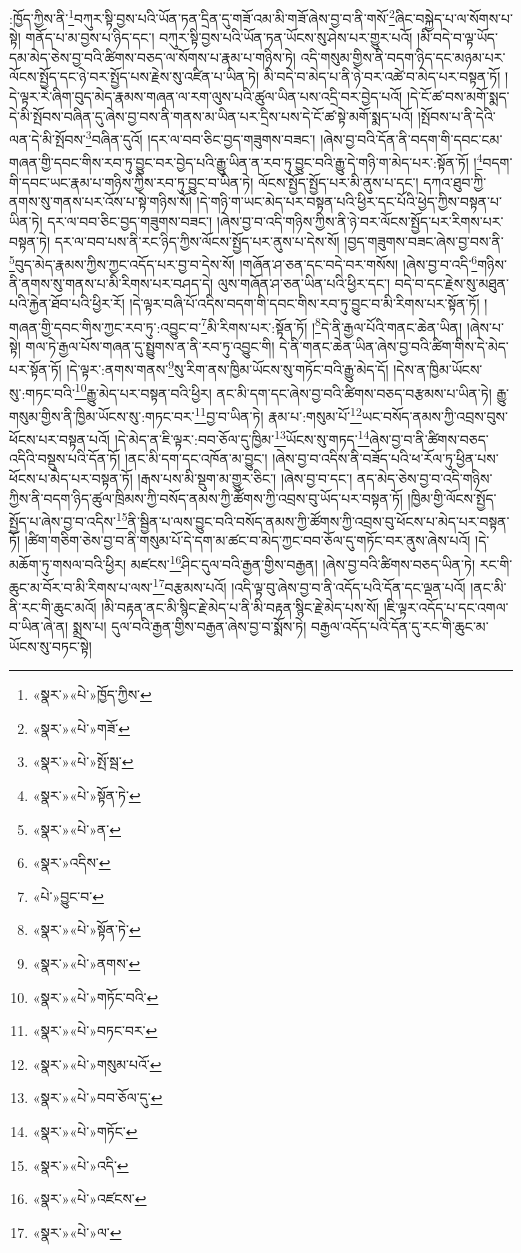 :ཁྱོད་ཀྱིས་ནི་\footnote{«སྣར་»«པེ་»ཁྱོད་ཀྱིས་}བཀུར་སྟི་བྱས་པའི་ཡོན་ཏན་དྲིན་དུ་གཟོ་འམ་མི་གཟོ་ཞེས་བྱ་བ་ནི་གསོ་\footnote{«སྣར་»«པེ་»གཟོ་}ཞིང་བསྐྱེད་པ་ལ་སོགས་པ་སྟེ། གནོད་པ་མ་བྱས་པ་ཉིད་དང་། བཀུར་སྟི་བྱས་པའི་ཡོན་ཏན་ཡོངས་སུ་ཤེས་པར་གྱུར་པའོ། །མི་བདེ་བ་ལྟ་ཡོད་དམ་མེད་ཅེས་བྱ་བའི་ཚིགས་བཅད་ལ་སོགས་པ་རྣམ་པ་གཉིས་ཏེ། འདི་གསུམ་གྱིས་ནི་བདག་ཉིད་དང་མཉམ་པར་ལོངས་སྤྱོད་དང་ཉེ་བར་སྤྱོད་པས་རྗེས་སུ་འཛིན་པ་ཡིན་ཏེ། མི་བདེ་བ་མེད་པ་ནི་ཉེ་བར་འཚེ་བ་མེད་པར་བསྟན་ཏོ། །དེ་ལྟར་རེ་ཞིག་བུད་མེད་རྣམས་གཞན་ལ་རག་ལུས་པའི་ཚུལ་ཡིན་པས་འདྲི་བར་བྱེད་པའོ། །དེ་ངོ་ཚ་བས་མགོ་སྨད་དེ་མི་སྤོབས་བཞིན་དུ་ཞེས་བྱ་བས་ནི་གནས་མ་ཡིན་པར་དྲིས་པས་དེ་ངོ་ཚ་སྟེ་མགོ་སྨད་པའོ། །སྤོབས་པ་ནི་དེའི་ལན་དེ་མི་སྤོབས་\footnote{«སྣར་»«པེ་»སྤོ་སྦ་}བཞིན་དུའོ། །དར་ལ་བབ་ཅིང་བྱད་གཟུགས་བཟང་། །ཞེས་བྱ་བའི་དོན་ནི་བདག་གི་དབང་ངམ་གཞན་གྱི་དབང་གིས་རབ་ཏུ་བྱུང་བར་བྱེད་པའི་རྒྱུ་ཡིན་ན་རབ་ཏུ་བྱུང་བའི་རྒྱུ་དེ་གཉི་ག་མེད་པར་:སྟོན་ཏོ། །\footnote{«སྣར་»«པེ་»སྟོན་ཏེ་}བདག་གི་དབང་ཡང་རྣམ་པ་གཉིས་ཀྱིས་རབ་ཏུ་བྱུང་བ་ཡིན་ཏེ། ལོངས་སྤྱོད་སྤྱོད་པར་མི་ནུས་པ་དང་། དཀའ་ཐུབ་ཀྱི་ནགས་སུ་གནས་པར་འོས་པ་སྟེ་གཉིས་སོ། །དེ་གཉི་ག་ཡང་མེད་པར་བསྟན་པའི་ཕྱིར་དང་པོའི་ཕྱེད་ཀྱིས་བསྟན་པ་ཡིན་ཏེ། དར་ལ་བབ་ཅིང་བྱད་གཟུགས་བཟང་། །ཞེས་བྱ་བ་འདི་གཉིས་ཀྱིས་ནི་ཉེ་བར་ལོངས་སྤྱོད་པར་རིགས་པར་བསྟན་ཏེ། དར་ལ་བབ་པས་ནི་རང་ཉིད་ཀྱིས་ལོངས་སྤྱོད་པར་ནུས་པ་དེས་སོ། །བྱད་གཟུགས་བཟང་ཞེས་བྱ་བས་ནི་\footnote{«སྣར་»«པེ་»ན་}བུད་མེད་རྣམས་ཀྱིས་ཀྱང་འདོད་པར་བྱ་བ་དེས་སོ། །གཞོན་ཤ་ཅན་དང་བདེ་བར་གསོས། །ཞེས་བྱ་བ་འདི་\footnote{«སྣར་»འདིས་}གཉིས་ནི་ནགས་སུ་གནས་པ་མི་རིགས་པར་བཤད་དེ། ལུས་གཞོན་ཤ་ཅན་ཡིན་པའི་ཕྱིར་དང་། བདེ་བ་དང་རྗེས་སུ་མཐུན་པའི་རྐྱེན་ཐོབ་པའི་ཕྱིར་རོ། །དེ་ལྟར་བཞི་པོ་འདིས་བདག་གི་དབང་གིས་རབ་ཏུ་བྱུང་བ་མི་རིགས་པར་སྟོན་ཏོ། །གཞན་གྱི་དབང་གིས་ཀྱང་རབ་ཏུ་:འབྱུང་བ་\footnote{«པེ་»བྱུང་བ་}མི་རིགས་པར་:སྟོན་ཏོ། །\footnote{«སྣར་»«པེ་»སྟོན་ཏེ་}དེ་ནི་རྒྱལ་པོའི་གནང་ཆེན་ཡིན། །ཞེས་པ་སྟེ། གལ་ཏེ་རྒྱལ་པོས་གཞན་དུ་སྤྱུགས་ན་ནི་རབ་ཏུ་འབྱུང་གི། དེ་ནི་གནང་ཆེན་ཡིན་ཞེས་བྱ་བའི་ཚིག་གིས་དེ་མེད་པར་སྟོན་ཏོ། །དེ་ལྟར་:ནགས་གནས་\footnote{«སྣར་»«པེ་»ནགས་}སུ་རིག་ནས་ཁྱིམ་ཡོངས་སུ་གཏོང་བའི་རྒྱུ་མེད་དོ། །དེས་ན་ཁྱིམ་ཡོངས་སུ་:གཏང་བའི་\footnote{«སྣར་»«པེ་»གཏོང་བའི་}རྒྱུ་མེད་པར་བསྟན་བའི་ཕྱིར། ནང་མི་དག་དང་ཞེས་བྱ་བའི་ཚིགས་བཅད་བརྩམས་པ་ཡིན་ཏེ། རྒྱུ་གསུམ་གྱིས་ནི་ཁྱིམ་ཡོངས་སུ་:གཏང་བར་\footnote{«སྣར་»«པེ་»བཏང་བར་}བྱ་བ་ཡིན་ཏེ། རྣམ་པ་:གསུམ་པོ་\footnote{«སྣར་»«པེ་»གསུམ་པའོ་}ཡང་བསོད་ནམས་ཀྱི་འབྲས་བུས་ཕོངས་པར་བསྟན་པའོ། །དེ་མེད་ན་ཇི་ལྟར་:བབ་ཅོལ་དུ་ཁྱིམ་\footnote{«སྣར་»«པེ་»བབ་ཅོལ་དུ་}ཡོངས་སུ་གཏད་\footnote{«སྣར་»«པེ་»གཏོང་}ཞེས་བྱ་བ་ནི་ཚིགས་བཅད་འདིའི་བསྡུས་པའི་དོན་ཏོ། །ནང་མི་དག་དང་འཁོན་མ་བྱུང་། །ཞེས་བྱ་བ་འདིས་ནི་བཟོད་པའི་ཕ་རོལ་ཏུ་ཕྱིན་པས་ཕོངས་པ་མེད་པར་བསྟན་ཏོ། །རྒས་པས་མི་སྡུག་མ་གྱུར་ཅིང་། །ཞེས་བྱ་བ་དང་། ནད་མེད་ཅེས་བྱ་བ་འདི་གཉིས་ཀྱིས་ནི་བདག་ཉིད་ཚུལ་ཁྲིམས་ཀྱི་བསོད་ནམས་ཀྱི་ཚོགས་ཀྱི་འབྲས་བུ་ཡོད་པར་བསྟན་ཏོ། །ཁྱིམ་གྱི་ལོངས་སྤྱོད་སྤྱོད་པ་ཞེས་བྱ་བ་འདིས་\footnote{«སྣར་»«པེ་»འདི་}ནི་སྦྱིན་པ་ལས་བྱུང་བའི་བསོད་ནམས་ཀྱི་ཚོགས་ཀྱི་འབྲས་བུ་ཕོངས་པ་མེད་པར་བསྟན་ཏོ། །ཚིག་གཅིག་ཅེས་བྱ་བ་ནི་གསུམ་པོ་དེ་དག་མ་ཚང་བ་མེད་ཀྱང་བབ་ཅོལ་དུ་གཏོང་བར་ནུས་ཞེས་པའོ། །དེ་མཆོག་ཏུ་གསལ་བའི་ཕྱིར། མཛངས་\footnote{«སྣར་»«པེ་»འཛངས་}ཤིང་དུལ་བའི་རྒྱན་གྱིས་བརྒྱན། །ཞེས་བྱ་བའི་ཚིགས་བཅད་ཡིན་ཏེ། རང་གི་ཆུང་མ་བོར་བ་མི་རིགས་པ་ལས་\footnote{«སྣར་»«པེ་»ལ་}བརྩམས་པའོ། །འདི་ལྟ་བུ་ཞེས་བྱ་བ་ནི་འདོད་པའི་དོན་དང་ལྡན་པའོ། །ནང་མི་ནི་རང་གི་ཆུང་མའོ། །མི་བརྟན་ནང་མི་སྙིང་རྗེ་མེད་པ་ནི་མི་བརྟན་སྙིང་རྗེ་མེད་པས་སོ། །ཇི་ལྟར་འདོད་པ་དང་འགལ་བ་ཡིན་ཞེ་ན། སྨྲས་པ། དུལ་བའི་རྒྱན་གྱིས་བརྒྱན་ཞེས་བྱ་བ་སྨོས་ཏེ། བརྒྱལ་འདོད་པའི་དོན་དུ་རང་གི་ཆུང་མ་ཡོངས་སུ་བཏང་སྟེ། 